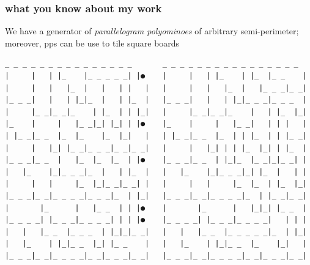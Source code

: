 \documentclass[9pt]{beamer}
\begin{document}
\begin{frame}[fragile]
\frametitle{what you know about my work}
We have a generator of \textit{parallelogram polyominoes} of arbitrary
semi-perimeter; moreover, pps can be use to tile square boards
\vfill
\begin{Verbatim}[baselinestretch=0.1, fontsize=\footnotesize]
 _ _ _ _ _ _ _ _ _ _ _ _ _ _ _       _ _ _ _ _ _ _ _ _ _ _ _ _ _ _ _
|     |   | |_    |_ _ _ _ _| |●    |     |   | |_    | |_  |_ _    |
|     |   |   |_  |   |   | |   |   |     |   |   |_  |   |_ _ _|_ _|
|_ _ _|   |   | |_|_  |   | |_  |   |_ _ _|   |   | |_|_ _ _|_ _ _  |
|     |_ _|_ _|_    | |_  | | |_|   |     |_ _|_ _|_    |   | |_  |_|
|_    |     |   |_ _|_| |_| | |●    |_    |     |   |_ _|   | | |   |
| |_ _|_ _  |_  |_    |_  |_|   |   | |_ _|_ _  |_  | | |_  | | |_ _|
|     |   |_| |_ _|_ _ _|_ _|_ _|   |     |   |_| | | |_  |_| | |_  |
|_ _ _|_ _  |   |_  |_  |_  | |●    |_ _ _|_ _  | |_|_  |_ _|_|_ _| |
|   |_    |_|_ _ _|_  |   | |_  |   |   |_    |_|_ _ _|_| |_  |   | |
|     |   |     |_  |_|_ _|_ _| |   |     |   |     |_  |_  | |_  |_|
|_ _ _|_ _|_ _ _ _|_ _ _|_  | |_|   |_ _ _|_ _|_ _ _ _|_  | |_ _|_ _|
|       |_      |   |_ _  | | |●    |       |_      |   |_|_| |_ _  |
|_ _ _ _| |_ _ _|_ _ _ _| | | |●    |_ _ _ _| |_ _ _|_ _ _ _|   | | |
|   |   |_ _  |_ _ _  | |_|_|_ _|   |   |   |_ _  |_ _ _ _ _|_  | |_|
|   |_    | |_|_ _  |_| |_ _    |   |   |_    | |_|_ _  |_    |_|   |
|_ _ _|_ _|_ _ _ _|_ _|_ _ _|_ _|   |_ _ _|_ _|_ _ _ _|_ _|_ _ _|_ _|
\end{Verbatim}
\end{frame}
\end{document}
